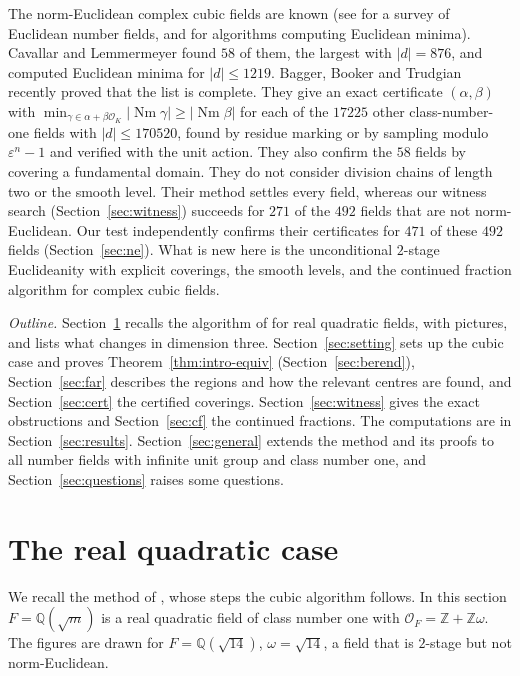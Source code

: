 \documentclass[11pt]{amsart}
\theoremstyle{definition}
\theoremstyle{remark}
\numberwithin{equation}{section}
\newcommand{\Q}{\mathbb{Q}}
\newcommand{\Z}{\mathbb{Z}}
\newcommand{\cO}{\mathcal{O}}
\newcommand{\Nm}{\operatorname{Nm}}
\begin{document}
The norm-Euclidean complex cubic fields are known (see \cite{Le} for a survey of Euclidean
number fields, and \cite{Ce,Lz} for algorithms computing Euclidean minima). Cavallar and
Lemmermeyer \cite{CL} found $58$ of them, the largest with $|d|=876$, and computed Euclidean
minima for $|d|\le1219$. Bagger, Booker and Trudgian \cite{BBT} recently proved
that the list is complete. They give an exact certificate $(\alpha,\beta)$ with
$\min_{\gamma\in\alpha+\beta\cO_K}|\Nm\gamma|\ge|\Nm\beta|$ for each of the $17225$ other
class-number-one fields with $|d|\le170520$, found by residue marking or by sampling modulo
$\varepsilon^n-1$ and verified with the unit action. They also confirm the $58$ fields by
covering a fundamental domain. They do not consider division chains of length two or the smooth
level. Their method settles every field, whereas our witness search
(Section~\ref{sec:witness}) succeeds for $271$ of the $492$ fields that are not norm-Euclidean.
Our test independently confirms their certificates for $471$ of these $492$ fields
(Section~\ref{sec:ne}). What is new here is the unconditional $2$-stage Euclideanity with
explicit coverings, the smooth levels, and the continued fraction algorithm for complex cubic
fields.

\emph{Outline.} Section~\ref{sec:quad} recalls the algorithm of \cite{GM} for real quadratic
fields, with pictures, and lists what changes in dimension three. Section~\ref{sec:setting} sets up
the cubic case and proves Theorem~\ref{thm:intro-equiv} (Section~\ref{sec:berend}),
Section~\ref{sec:far} describes the regions and how the relevant centres are
found, and Section~\ref{sec:cert} the certified coverings. Section~\ref{sec:witness} gives the
exact obstructions and Section~\ref{sec:cf} the continued fractions. The computations are in
Section~\ref{sec:results}. Section~\ref{sec:general} extends the method and its proofs to all
number fields with infinite unit group and class number one, and Section~\ref{sec:questions}
raises some questions.

\section{The real quadratic case}\label{sec:quad}

We recall the method of \cite{GM}, whose steps the cubic algorithm follows. In this section
$F=\Q(\sqrt m)$ is a real quadratic field of class number one with $\cO_F=\Z+\Z\omega$. The
figures are drawn for $F=\Q(\sqrt{14})$, $\omega=\sqrt{14}$, a field that is $2$-stage but not
norm-Euclidean.
\end{document}
